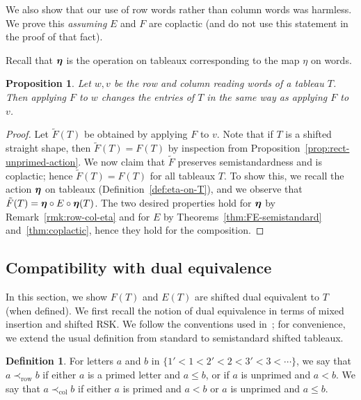 \documentclass[10pt]{amsart}
\newtheorem{prop}[theorem]{Proposition}
\theoremstyle{definition}
\newtheorem{defi}[theorem]{Definition}
\DeclareMathOperator{\row}{row}
\DeclareMathOperator{\col}{col}
\begin{document}
We also show that our use of row words rather than column words was harmless. We prove this \emph{assuming} $E$ and $F$ are coplactic (and do not use this statement in the proof of that fact). 

Recall that $\boldsymbol{\eta}$ is the operation on tableaux corresponding to the map $\eta$ on words.

\begin{prop} \label{prop:rows-columns}
Let $w, v$ be the row and column reading words of a tableau $T$. Then applying $F$ to $w$ changes the entries of $T$ in the same way as applying $F$ to $v$.
\end{prop}
\begin{proof}
Let $\tilde{F}(T)$ be obtained by applying $F$ to $v$. Note that if $T$ is a shifted straight shape, then $\tilde{F}(T) = F(T)$ by inspection from Proposition~\ref{prop:rect-unprimed-action}. We now claim that $\tilde{F}$ preserves semistandardness and is coplactic; hence $\tilde{F}(T) = F(T)$ for all tableaux $T$. To show this, we recall the action $\boldsymbol{\eta}$ on tableaux (Definition~\ref{def:eta-on-T}), and we observe that $\tilde{F}(T) = \boldsymbol{\eta} \circ E \circ \boldsymbol{\eta}(T)$. The two desired properties hold for $\boldsymbol{\eta}$ by Remark~\ref{rmk:row-col-eta} and for $E$ by Theorems~\ref{thm:FE-semistandard} and~\ref{thm:coplactic}, hence they hold for the composition.
\end{proof}



\subsection{Compatibility with dual equivalence}

In this section, we show $F(T)$ and $E(T)$ are shifted dual equivalent to $T$ (when defined). We first recall the notion of dual equivalence in terms of mixed insertion and shifted RSK. We follow the conventions used in~\cite{Sagan}; for convenience, we extend the usual definition from standard to semistandard shifted tableaux.

\begin{defi}
For letters $a$ and $b$ in $\{1'<1<2'<2<3'<3<\cdots\}$, we say that $a\prec_{\row} b$ if either $a$ is a primed letter and $a\le b$, or if $a$ is unprimed and $a<b$. We say that $a\prec_{\col} b$ if either $a$ is primed and $a<b$ or $a$ is unprimed and $a\le b$. 
\end{defi}
\end{document}
